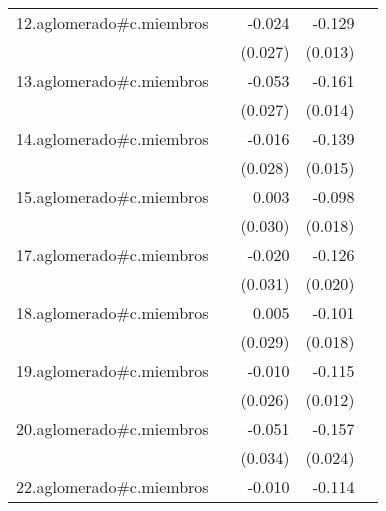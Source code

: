 {\begin{longtable}{l*{4}{D{.}{.}{-1}}}
\addlinespace
12.aglomerado#c.miembros&                     &      -0.024         &      -0.129\sym{***}&                     \\
            &                     &     (0.027)         &     (0.013)         &                     \\
\addlinespace
13.aglomerado#c.miembros&                     &      -0.053\sym{*}  &      -0.161\sym{***}&                     \\
            &                     &     (0.027)         &     (0.014)         &                     \\
\addlinespace
14.aglomerado#c.miembros&                     &      -0.016         &      -0.139\sym{***}&                     \\
            &                     &     (0.028)         &     (0.015)         &                     \\
\addlinespace
15.aglomerado#c.miembros&                     &       0.003         &      -0.098\sym{***}&                     \\
            &                     &     (0.030)         &     (0.018)         &                     \\
\addlinespace
17.aglomerado#c.miembros&                     &      -0.020         &      -0.126\sym{***}&                     \\
            &                     &     (0.031)         &     (0.020)         &                     \\
\addlinespace
18.aglomerado#c.miembros&                     &       0.005         &      -0.101\sym{***}&                     \\
            &                     &     (0.029)         &     (0.018)         &                     \\
\addlinespace
19.aglomerado#c.miembros&                     &      -0.010         &      -0.115\sym{***}&                     \\
            &                     &     (0.026)         &     (0.012)         &                     \\
\addlinespace
20.aglomerado#c.miembros&                     &      -0.051         &      -0.157\sym{***}&                     \\
            &                     &     (0.034)         &     (0.024)         &                     \\
\addlinespace
22.aglomerado#c.miembros&                     &      -0.010         &      -0.114\sym{***}&                     \\

\end{longtable}}
